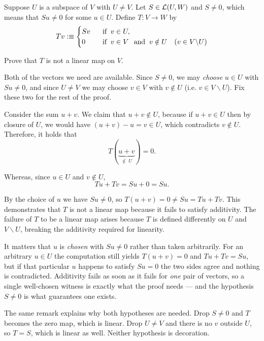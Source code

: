 \setcounter{xrcscount}{11}
\begin{xrcs}
  Suppose $U$ is a subspace of $V$ with $U \neq V$. Let $S \in \mathcal{L}(U, W)$ and $S \neq 0$, which means that $Su \neq 0$ for some $u \in U$. Define $T: V \to W$ by
  \begin{equation}
    Tv :\equiv
    \begin{cases}
      Sv & \;\;\, \text{if}\;\; v \in U, \\
      0  & \;\;\, \text{if}\;\; v \in V \;\;\, \text{and}\;\; v \notin U \quad (v \in V \backslash U)
    \end{cases}
  \end{equation}

  Prove that $T$ is not a linear map on $V$.

  \begin{xprf}
    Both of the vectors we need are available. Since $S \neq 0$, we may \emph{choose} $u \in U$ with $Su \neq 0$, and since $U \neq V$ we may choose $v \in V$ with $v \notin U$ (i.e. $v \in V \backslash U$). Fix these two for the rest of the proof.

    Consider the sum $u + v$. We claim that $u+v \notin U$, because if $u+v \in U$ then by closure of $U$, we would have $(u+v)-u = v \in U$, which contradicts $v \notin U$. Therefore, it holds that
    \begin{equation}
      T(\underbrace{u+v}_{\notin \; U}) = 0.
    \end{equation}

    Whereas, since $u \in U$ and $v \notin U$,
    \begin{equation}
      Tu + Tv = Su + 0 = Su.
    \end{equation}

    By the choice of $u$ we have $Su \neq 0$, so $T(u+v) = 0 \neq Su = Tu + Tv$. This demonstrates that $T$ is not a linear map because it fails to satisfy additivity. The failure of $T$ to be a linear map arises because $T$
     is defined differently on $U$ and $V \backslash U$, breaking the additivity required for linearity.
  \end{xprf}
\end{xrcs}

\begin{ainote}
  It matters that $u$ is \emph{chosen} with $Su \neq 0$ rather than taken arbitrarily. For an arbitrary $u \in U$ the computation still yields $T(u+v) = 0$ and $Tu + Tv = Su$, but if that particular $u$ happens to satisfy $Su = 0$ the two sides agree and nothing is contradicted. Additivity fails as soon as it fails for \emph{one} pair of vectors, so a single well-chosen witness is exactly what the proof needs --- and the hypothesis $S \neq 0$ is what guarantees one exists.

  The same remark explains why both hypotheses are needed. Drop $S \neq 0$ and $T$ becomes the zero map, which is linear. Drop $U \neq V$ and there is no $v$ outside $U$, so $T = S$, which is linear as well. Neither hypothesis is decoration.
\end{ainote}

